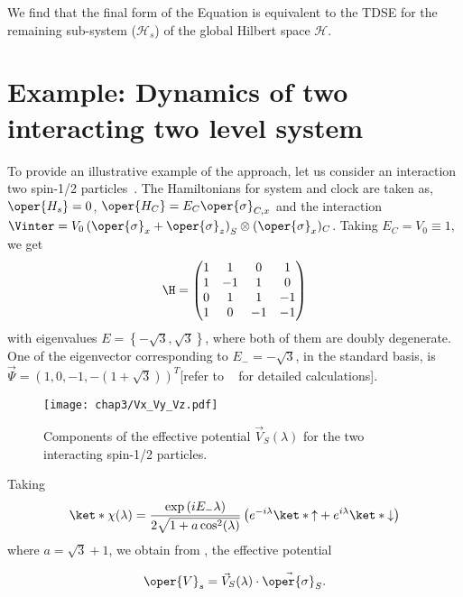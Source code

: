 We find that the final form of the Equation is equivalent to the TDSE for the remaining sub-system (\(\mathcal{H}_s\)) of the
global Hilbert space \(\mathcal{H}\).

\section{Example: Dynamics of two interacting two level system\label{sec:chap3_2spin_interact}}

To provide an illustrative example of the approach, let us consider an interaction two spin-1/2 particles~\cite{Gemsheim:2023izg}.
The Hamiltonians for system and clock are taken as, \(\oper{H_s} = 0\), \(\oper{H_C} = E_C\oper{\sigma}_{C, x}\)
and the interaction 
\(\Vinter = V_0\left(\oper{\sigma}_{x} + \oper{\sigma}_{z}\right)_S\otimes (\oper{\sigma}_{x})_C\). 
Taking \(E_C = V_0 \equiv 1\), we get
\begin{equation}
    \H = \begin{pmatrix}
        1 & 1 & 0 & 1 \\
        1 & -1 & 1 & 0 \\
        0 & 1 & 1 & -1 \\
        1 & 0 & -1 & -1
        \end{pmatrix}
\end{equation}
with eigenvalues \(E = \left\{-\sqrt{3}, \sqrt{3}\right\}\), 
where both of them are doubly degenerate. One of the eigenvector
corresponding to \(E_- = -\sqrt{3}\), in the standard basis, is
\(\vec{\Psi} = \left(1, 0, -1, -(1 + \sqrt{3})\right)^T\)[refer to ~ for detailed calculations].
\begin{figure}[!h]
    \centering
    \texttt{[image: chap3/Vx\_Vy\_Vz.pdf]}
    \caption{Components of the effective potential \(\vec{V}_S(\lambda)\) for the two interacting spin-1/2 particles.}
    \label{fig:chap3_effective_potential}
\end{figure}


Taking
\begin{equation}
    \ket*{\chi(\lambda)} = 
    \frac{\exp\left(i E_- \lambda\right)}{
        2\sqrt{1 + a \cos^2(\lambda)}} \left(e^{-i\lambda} \ket*{\uparrow} + e^{i\lambda} \ket*{\downarrow} \right)
\end{equation} 
where \(a = \sqrt{3} + 1\), we obtain from , the effective potential

\begin{equation}
    \oper{V}_s = \vec{V}_S(\lambda)\cdot\vec{\oper{\sigma}}_S. 
\end{equation}

